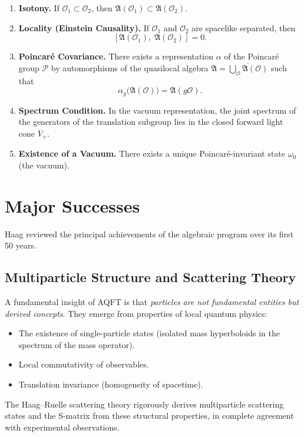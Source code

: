 \documentclass[11pt,a4paper]{article}
\begin{document}
\begin{enumerate}
  \item \textbf{Isotony.} If $\mathcal{O}_1 \subset \mathcal{O}_2$, then
        $\mathfrak{A}(\mathcal{O}_1) \subset \mathfrak{A}(\mathcal{O}_2)$.

  \item \textbf{Locality (Einstein Causality).} If $\mathcal{O}_1$ and
        $\mathcal{O}_2$ are spacelike separated, then
        \[
          [\mathfrak{A}(\mathcal{O}_1),\;\mathfrak{A}(\mathcal{O}_2)] = 0.
        \]

  \item \textbf{Poincar\'e Covariance.} There exists a representation
        $\alpha$ of the Poincar\'e group $\mathcal{P}$ by automorphisms of
        the quasilocal algebra
        $\mathfrak{A} = \overline{\bigcup_{\mathcal{O}} \mathfrak{A}(\mathcal{O})}$
        such that
        \[
          \alpha_g\bigl(\mathfrak{A}(\mathcal{O})\bigr) = \mathfrak{A}(g\mathcal{O}).
        \]

  \item \textbf{Spectrum Condition.} In the vacuum representation, the joint
        spectrum of the generators of the translation subgroup lies in the
        closed forward light cone $\overline{V}_+$.

  \item \textbf{Existence of a Vacuum.} There exists a unique Poincar\'e-invariant
        state $\omega_0$ (the vacuum).
\end{enumerate}

\section{Major Successes}

Haag reviewed the principal achievements of the algebraic program over
its first 50 years.

\subsection{Multiparticle Structure and Scattering Theory}

A fundamental insight of AQFT is that \emph{particles are not fundamental
entities but derived concepts}. They emerge from properties of local
quantum physics:
\begin{itemize}[nosep]
  \item The existence of single-particle states (isolated mass hyperboloids
        in the spectrum of the mass operator).
  \item Local commutativity of observables.
  \item Translation invariance (homogeneity of spacetime).
\end{itemize}
The Haag--Ruelle scattering theory rigorously derives multiparticle
scattering states and the S-matrix from these structural properties,
in complete agreement with experimental observations.
\end{document}
